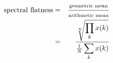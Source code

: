 \documentclass{article}
\begin{document}
 
\begin{eqnarray*}
\mbox{spectral flatness} & = & \frac{\mbox{\scriptsize geometric mean}}{\mbox{\scriptsize arithmetic mean}} \\
   & =  & \frac{\sqrt[N]{\displaystyle\prod_k x(k)}} {\frac{1}{N} \displaystyle\sum_k x(k)}
\end{eqnarray*}
 \newpage 
\end{document}
